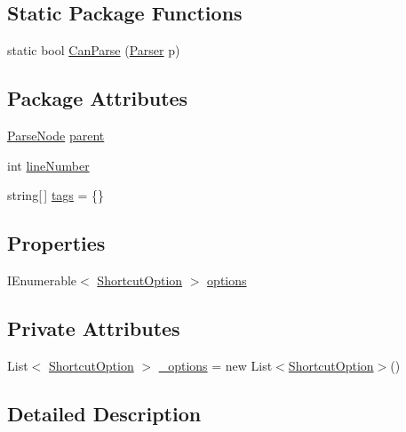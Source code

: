 \subsection*{Static Package Functions}
\begin{DoxyCompactItemize}
\item 
static bool \hyperlink{a00160_a906962aae2ecb11535f34249a34703f8}{Can\-Parse} (\hyperlink{a00149}{Parser} p)
\end{DoxyCompactItemize}
\subsection*{Package Attributes}
\begin{DoxyCompactItemize}
\item 
\hyperlink{a00148}{Parse\-Node} \hyperlink{a00148_af313a82103fcc2ff5a177dbb06b92f7b}{parent}
\item 
int \hyperlink{a00148_a18b493382de0fde5b4299c1bd2250075}{line\-Number}
\item 
string\mbox{[}$\,$\mbox{]} \hyperlink{a00148_a58b3a15788fd2d4127d73619dc6d04ae}{tags} = \{\}
\end{DoxyCompactItemize}
\subsection*{Properties}
\begin{DoxyCompactItemize}
\item 
I\-Enumerable$<$ \hyperlink{a00159}{Shortcut\-Option} $>$ \hyperlink{a00160_a91b28e9dce684c476c526c4103b6c488}{options}
\end{DoxyCompactItemize}
\subsection*{Private Attributes}
\begin{DoxyCompactItemize}
\item 
List$<$ \hyperlink{a00159}{Shortcut\-Option} $>$ \hyperlink{a00160_a494c8c422cebbea5c50878db64334873}{\-\_\-options} = new List$<$\hyperlink{a00159}{Shortcut\-Option}$>$()
\end{DoxyCompactItemize}


\subsection{Detailed Description}


